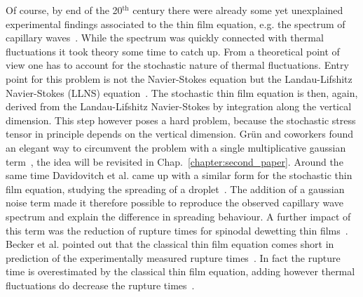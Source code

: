 Of course, by end of the 20$^{\text{th}}$ century there were already some yet unexplained experimental findings associated to the thin film equation, e.g. the spectrum of capillary waves~\cite{doi:10.1021/ja01014a015}.
While the spectrum was quickly connected with thermal fluctuations it took theory some time to catch up.
From a theoretical point of view one has to account for the stochastic nature of thermal fluctuations.
Entry point for this problem is not the Navier-Stokes equation but the Landau-Lifshitz Navier-Stokes (LLNS) equation~\cite{Landau1987Fluid}.
The stochastic thin film equation is then, again, derived from the Landau-Lifshitz Navier-Stokes by integration along the vertical dimension.
This step however poses a hard problem, because the stochastic stress tensor in principle depends on the vertical dimension.
Grün and coworkers found an elegant way to circumvent the problem with a single multiplicative gaussian term~\cite{Grun2006, Mecke_2005, PhysRevLett.99.114503, PhysRevE.102.053105, PhysRevE.100.023108, PhysRevE.92.061002}, the idea will be revisited in Chap.~\ref{chapter:second_paper}.
Around the same time Davidovitch et al. came up with a similar form for the stochastic thin film equation, studying the spreading of a droplet~\cite{PhysRevLett.95.244505}.
The addition of a gaussian noise term made it therefore possible to reproduce the observed capillary wave spectrum and explain the difference in spreading behaviour.
A further impact of this term was the reduction of rupture times for spinodal dewetting thin films~\cite{Grun2006, PhysRevLett.99.114503}.
Becker et al. pointed out that the classical thin film equation comes short in prediction of the experimentally measured rupture times~\cite{beckerComplexDewettingScenarios2003}.
In fact the rupture time is overestimated by the classical thin film equation, adding however thermal fluctuations do decrease the rupture times~\cite{Duran_Olivencia2019, shah_van_steijn_kleijn_kreutzer_2019}.

